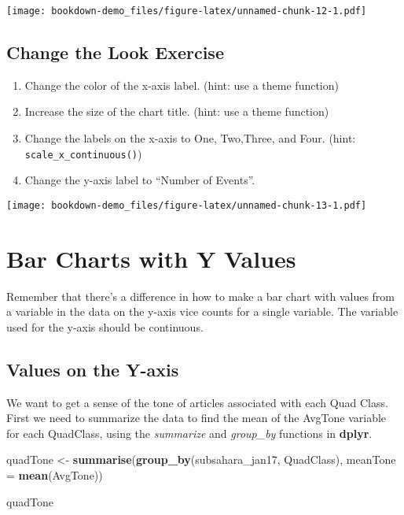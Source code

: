 \documentclass[]{book}
\newenvironment{Shaded}{\begin{snugshade}}{\end{snugshade}}
\newcommand{\KeywordTok}[1]{\textcolor[rgb]{0.13,0.29,0.53}{\textbf{{#1}}}}
\newcommand{\DataTypeTok}[1]{\textcolor[rgb]{0.13,0.29,0.53}{{#1}}}
\newcommand{\StringTok}[1]{\textcolor[rgb]{0.31,0.60,0.02}{{#1}}}
\newcommand{\NormalTok}[1]{{#1}}
\providecommand{\tightlist}{%
  \setlength{\itemsep}{0pt}\setlength{\parskip}{0pt}}
\theoremstyle{definition}
\theoremstyle{definition}
\theoremstyle{remark}
\begin{document}
\texttt{[image: bookdown-demo\_files/figure-latex/unnamed-chunk-12-1.pdf]}

\section{Change the Look Exercise}\label{change-the-look-exercise}

\begin{enumerate}
\def\labelenumi{\arabic{enumi}.}
\tightlist
\item
  Change the color of the x-axis label. (hint: use a theme function)
\item
  Increase the size of the chart title. (hint: use a theme function)
\item
  Change the labels on the x-axis to One, Two,Three, and Four. (hint:
  \texttt{scale\_x\_continuous()})
\item
  Change the y-axis label to ``Number of Events''.
\end{enumerate}

\texttt{[image: bookdown-demo\_files/figure-latex/unnamed-chunk-13-1.pdf]}

\chapter{Bar Charts with Y Values}\label{bar-charts-with-y-values}

Remember that there's a difference in how to make a bar chart with
values from a variable in the data on the y-axis vice counts for a
single variable. The variable used for the y-axis should be continuous.

\section{Values on the Y-axis}\label{values-on-the-y-axis}

We want to get a sense of the tone of articles associated with each Quad
Class. First we need to summarize the data to find the mean of the
AvgTone variable for each QuadClass, using the \emph{summarize} and
\emph{group\_by} functions in \textbf{dplyr}.

\begin{Shaded}
\begin{Highlighting}[]
\NormalTok{quadTone <-}\StringTok{ }\KeywordTok{summarise}\NormalTok{(}\KeywordTok{group_by}\NormalTok{(subsahara_jan17, QuadClass), }\DataTypeTok{meanTone =} \KeywordTok{mean}\NormalTok{(AvgTone))}

\NormalTok{quadTone}
\end{Highlighting}
\end{Shaded}
\end{document}
